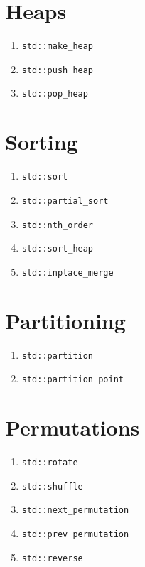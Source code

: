 \documentclass{article}
\begin{document}
\RaggedRight
\setlength{\columnseprule}{0.4pt}

\begin{multicols}{3}
\section{Heaps}
\begin{enumerate}
\setlength\itemsep{0em}
\item \texttt{std::make\_heap}
\item \texttt{std::push\_heap}
\item \texttt{std::pop\_heap}
\end{enumerate}

\section{Sorting}
\begin{enumerate}[resume]
\setlength\itemsep{0em}
\item \texttt{std::sort}
\item \texttt{std::partial\_sort}
\item \texttt{std::nth\_order}
\item \texttt{std::sort\_heap}
\item \texttt{std::inplace\_merge}
\end{enumerate}

\section{Partitioning}
\begin{enumerate}[resume]
\setlength\itemsep{0em}
\item \texttt{std::partition}
\item \texttt{std::partition\_point}
\end{enumerate}

\section{Permutations}
\begin{enumerate}[resume]
\setlength\itemsep{0em}
\item \texttt{std::rotate}
\item \texttt{std::shuffle}
\item \texttt{std::next\_permutation}
\item \texttt{std::prev\_permutation}
\item \texttt{std::reverse}
\end{enumerate}


\end{multicols}
\end{document}
